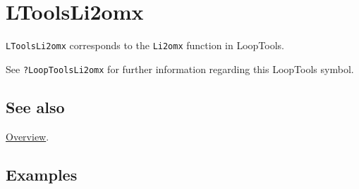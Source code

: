 \documentclass[../FeynHelpersManual.tex]{subfiles}
\begin{document}
\hypertarget{ltoolsli2omx}{
\section{LToolsLi2omx}\label{ltoolsli2omx}}

\texttt{LToolsLi2omx} corresponds to the \texttt{Li2omx} function in
LoopTools.

See \texttt{?LoopTools\textasciigrave Li2omx} for further information
regarding this LoopTools symbol.

\subsection{See also}

\hyperlink{toc}{Overview}.

\subsection{Examples}
\end{document}
